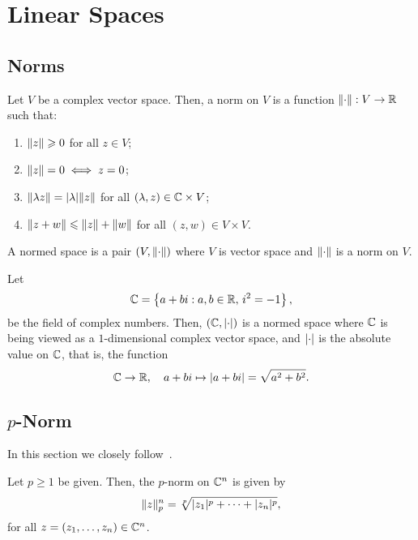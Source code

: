 \section{Linear Spaces}\label{sec:linear-spaces}

\subsection{Norms}\label{subsec:norms}

\begin{definition}\label{def:normed-linear-spaces}
  Let \(V\) be a complex vector space. Then, a norm on \(V\) is a function
  \(\norm:V\to\reals\) such that:
  \begin{enumerate}
    \item
      \(\norm(z)\geqslant{0}\) for all \(z\in{V}\);
    \item
      \(\norm(z)=0\iff{z=0}\);
    \item
      \(\norm(\lambda{z})=\abs{\lambda}\norm(z)\) for all
      \((\lambda,z)\in\mathbb{C}\times{V}\);
    \item
      \(\norm(z+w)\leqslant{\norm(z)+\norm(w)}\) for all
      \((z,w)\in{V\times{V}}\).
  \end{enumerate}
  A normed space is a pair \((V,\norm)\) where \(V\) is vector space and
  \(\norm\) is a norm on \(V\).
\end{definition}

\begin{example}\label{the-complex-field-is-a-normed-linear-space}
  Let
  \[
    \mathbb{C}=\left\{a+bi:a,b\in\mathbb{R},\,i^{2}=-1\right\},
  \]
  be the field of complex numbers. Then, \((\mathbb{C},\lvert\cdot\rvert)\) is a
  normed space where \(\mathbb{C}\) is being viewed as a \(1\)-dimensional
  complex vector space, and \(\lvert\cdot\rvert\) is the absolute value on
  \(\mathbb{C}\), that is, the function
  \[
    \mathbb{C}\to\mathbb{R},
    \quad{a+bi\mapsto\lvert a+bi\rvert=\sqrt{{a}^{2}+{b}^{2}}}.
  \]
\end{example}


\subsection{\(p\)-Norm}\label{subsec:p-norm}

In this section we closely
follow~\cite{yet_another_proof_of_minkowskis_inequality}.

\begin{definition}
  Let \(p\geqslant{1}\) be given. Then, the \(p\)-norm on \(\mathbb{C}^{n}\)
  is given by
  \[
    \norm<n>[p](z)
    =
    \sqrt[p]{\abs{z_{1}}^{p}+\cdots+\abs{z_{n}}^{p}},
  \]
  for all \(z=(z_{1},\ldots,z_{n})\in\mathbb{C}^{n}\).
\end{definition}

